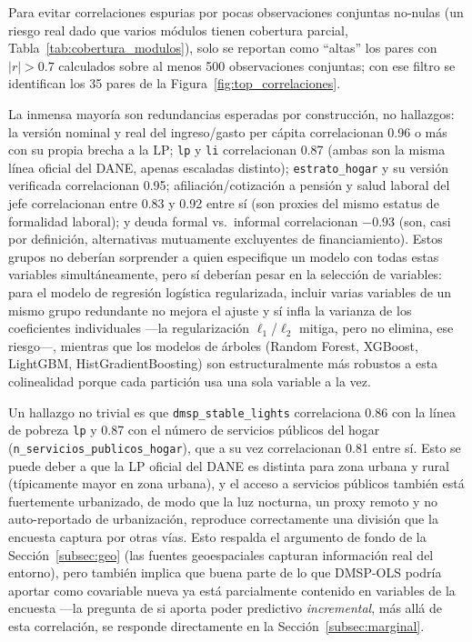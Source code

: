 \documentclass[12pt, letterpaper]{article}
\begin{document}
Para evitar correlaciones espurias por pocas observaciones conjuntas
no-nulas (un riesgo real dado que varios módulos tienen cobertura
parcial, Tabla~\ref{tab:cobertura_modulos}), solo se reportan como
``altas'' los pares con $|r|>0.7$ calculados sobre al menos 500
observaciones conjuntas; con ese filtro se identifican los 35 pares de la
Figura~\ref{fig:top_correlaciones}.

La inmensa mayoría son redundancias esperadas por construcción, no
hallazgos: la versión nominal y real del ingreso/gasto per cápita
correlacionan 0.96 o más con su propia brecha a la LP; \texttt{lp} y
\texttt{li} correlacionan 0.87 (ambas son la misma línea oficial del
DANE, apenas escaladas distinto); \texttt{estrato\_hogar} y su versión
verificada correlacionan 0.95; afiliación/cotización a pensión y salud
laboral del jefe correlacionan entre 0.83 y 0.92 entre sí (son proxies del
mismo estatus de formalidad laboral); y deuda formal vs.\ informal
correlacionan $-0.93$ (son, casi por definición, alternativas mutuamente
excluyentes de financiamiento). Estos grupos no deberían sorprender a
quien especifique un modelo con todas estas variables simultáneamente,
pero sí deberían pesar en la selección de variables: para el modelo de
regresión logística regularizada, incluir varias variables de un mismo
grupo redundante no mejora el ajuste y sí infla la varianza de los
coeficientes individuales —la regularización $\ell_1$/$\ell_2$ mitiga,
pero no elimina, ese riesgo—, mientras que los modelos de árboles (Random
Forest, XGBoost, LightGBM, HistGradientBoosting) son estructuralmente más
robustos a esta colinealidad porque cada partición usa una sola variable a
la vez.

Un hallazgo no trivial es que \texttt{dmsp\_stable\_lights} correlaciona
0.86 con la línea de pobreza \texttt{lp} y 0.87 con el número de
servicios públicos del hogar (\texttt{n\_servicios\_publicos\_hogar}), que a
su vez correlacionan 0.81 entre sí.
Esto se puede deber a que la LP oficial del DANE es distinta para zona
urbana y rural (típicamente mayor en zona urbana), y el acceso a
servicios públicos también está fuertemente urbanizado, de modo que la
luz nocturna, un proxy remoto y no auto-reportado de urbanización,
reproduce correctamente una división que la encuesta captura por otras
vías. Esto respalda el argumento de fondo de la Sección~\ref{subsec:geo}
(las fuentes geoespaciales capturan información real del entorno), pero
también implica que buena parte de lo que DMSP-OLS podría aportar como
covariable nueva ya está parcialmente contenido en variables de la
encuesta —la pregunta de si aporta poder predictivo \emph{incremental},
más allá de esta correlación, se responde directamente en la
Sección~\ref{subsec:marginal}.
\end{document}
